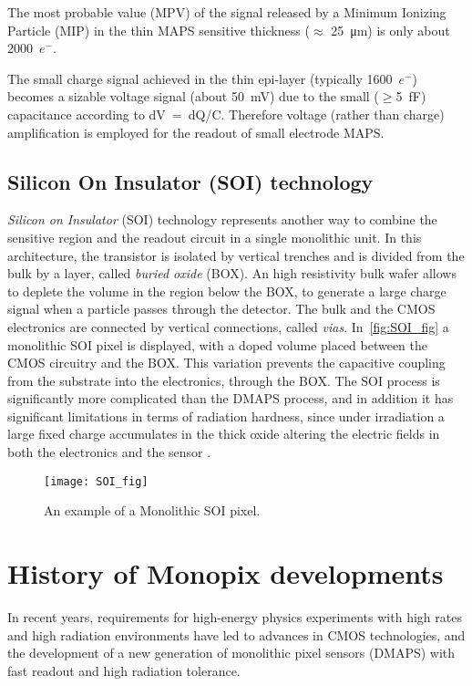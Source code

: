 The most probable value (MPV) of the signal released by a Minimum Ionizing Particle (MIP) in the thin MAPS sensitive thickness ($\approx$ \SI{25}{\micro m}) is only about 2000~$e^{-}$. 

The small charge signal achieved in the thin epi-layer (typically 1600~$e^{-}$) becomes a sizable voltage signal (about \SI{50}{mV}) due to the small ($\geq$\SI{5}{fF}) capacitance according to dV~=~dQ/C. Therefore voltage (rather than charge) amplification is employed for the readout of small electrode MAPS.



\subsection{Silicon On Insulator (SOI) technology}\label{sec:SOI_tech}

\textit{Silicon on Insulator} (SOI) technology represents another way to combine the sensitive region and the readout circuit in a single monolithic unit. In this architecture, the transistor is isolated by vertical trenches and is divided from the bulk by a  layer, called \emph{buried oxide} (BOX).
An high resistivity bulk wafer allows to deplete the volume in the region below the BOX, to generate a large charge signal when a particle passes through the detector. The bulk and the CMOS electronics are connected by vertical connections, called \textit{vias}. In~\autoref{fig:SOI_fig} a monolithic SOI pixel is displayed, with a doped volume placed between the CMOS circuitry and the BOX. This variation prevents the capacitive coupling from the substrate into the electronics, through the BOX.
The SOI process is significantly more complicated than the DMAPS process, and in addition it has significant limitations in terms of radiation hardness, since under irradiation a large fixed charge accumulates in the thick oxide altering the electric fields in both the electronics and the sensor \cite{Battaglia:2009qu}.

\begin{figure}[h!]
\centering
\texttt{[image: SOI\_fig]}
\caption{An example of a Monolithic SOI pixel.}
\label{fig:SOI_fig}
\end{figure}


\section{History of Monopix developments}

In recent years, requirements for high-energy physics experiments with high rates and high radiation environments have led to advances in CMOS technologies, and the development of a new generation of monolithic pixel sensors (DMAPS) with fast readout and high radiation tolerance.

